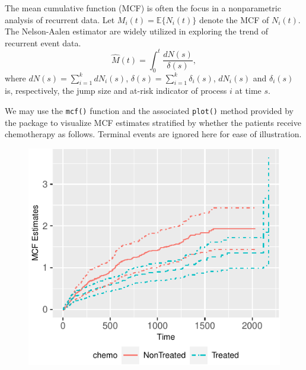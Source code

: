 The mean cumulative function (MCF) is often the focus in a nonparametric
analysis of recurrent data. Let \(M_i(t)=\mathbb{E}\{N_i(t)\}\) denote
the MCF of \(N_i(t)\). The Nelson-Aalen estimator \citep{nelson2003siam}
are widely utilized in exploring the trend of recurrent event data.
\[\hat{M}(t) = \int_0^t \frac{dN(s)}{\delta(s)},\] where
\(dN(s)=\sum_{i=1}^k dN_i(s)\),
\(\delta(s) = \sum_{i=1}^k \delta_i(s)\), \(dN_i(s)\) and
\(\delta_i(s)\) is, respectively, the jump size and at-risk indicator of
process \(i\) at time \(s\).

We may use the \texttt{mcf()} function and the associated
\texttt{plot()} method provided by the  package to visualize
MCF estimates stratified by whether the patients receive chemotherapy as
follows. Terminal events are ignored here for ease of illustration.

\begin{Shaded}
\begin{Highlighting}[]
\StringTok{ }\NormalTok{(}\StringTok{ } 
 \NormalTok{, } \NormalTok{:}\NormalTok{) +}
\StringTok{    }\NormalTok{(} \NormalTok{)}
\end{Highlighting}
\end{Shaded}

\begin{figure}[H]
\includegraphics[scale = 1]{reda-mcf_files/figure-latex/plot-sampleMcf-1}
\end{figure}


